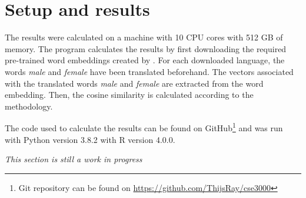 \section{Setup and results}
The results were calculated on a machine with 10 CPU cores with 512 GB of
memory. The program calculates the results by first downloading
the required pre-trained word embeddings created by \textcite{grave2018learning}. 
For each downloaded language, the words \textit{male} and \textit{female} have been
translated beforehand.
The vectors associated with the translated words \textit{male} and \textit{female} are
extracted from the word embedding. Then, the cosine similarity is calculated
according to the methodology.

The code used to calculate the results can be found on 
GitHub\footnote{Git repository can be found on \url{https://github.com/ThijsRay/cse3000}} 
and was run with Python version 3.8.2 with R version 4.0.0.

\textit{This section is still a work in progress}



